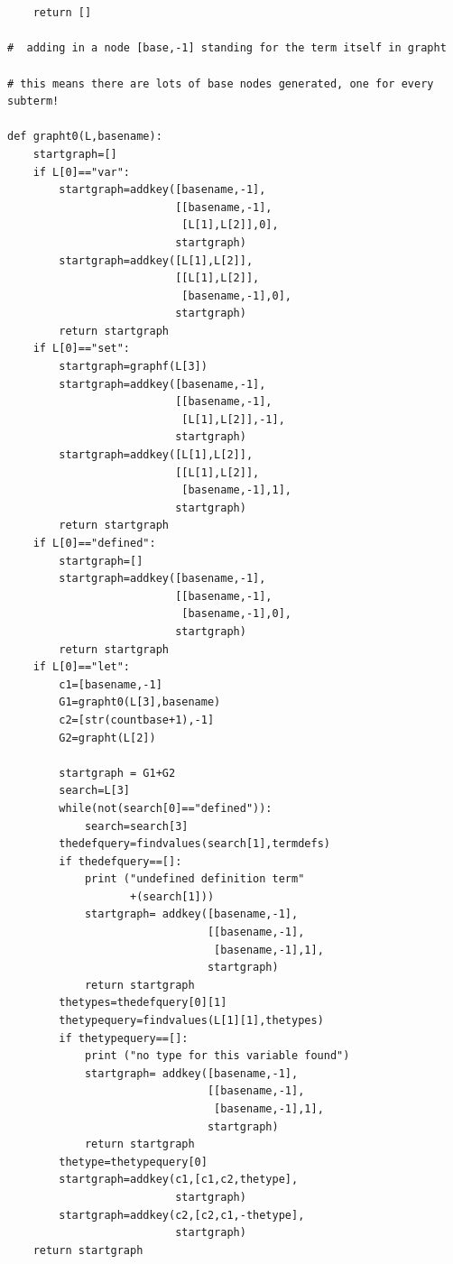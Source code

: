 \documentclass{article}
\begin{document}
\begin{verbatim}
        
        
    return []

#  adding in a node [base,-1] standing for the term itself in grapht

# this means there are lots of base nodes generated, one for every subterm!

def grapht0(L,basename):
    startgraph=[]
    if L[0]=="var":
        startgraph=addkey([basename,-1],
                          [[basename,-1],
                           [L[1],L[2]],0],
                          startgraph)
        startgraph=addkey([L[1],L[2]],
                          [[L[1],L[2]],
                           [basename,-1],0],
                          startgraph)
        return startgraph
    if L[0]=="set":
        startgraph=graphf(L[3])
        startgraph=addkey([basename,-1],
                          [[basename,-1],
                           [L[1],L[2]],-1],
                          startgraph)
        startgraph=addkey([L[1],L[2]],
                          [[L[1],L[2]],
                           [basename,-1],1],
                          startgraph)
        return startgraph
    if L[0]=="defined":
        startgraph=[]
        startgraph=addkey([basename,-1],
                          [[basename,-1],
                           [basename,-1],0],
                          startgraph)
        return startgraph
    if L[0]=="let":
        c1=[basename,-1]
        G1=grapht0(L[3],basename)
        c2=[str(countbase+1),-1]
        G2=grapht(L[2])
        
        startgraph = G1+G2
        search=L[3]
        while(not(search[0]=="defined")):
            search=search[3]
        thedefquery=findvalues(search[1],termdefs)
        if thedefquery==[]:
            print ("undefined definition term"
                   +(search[1]))
            startgraph= addkey([basename,-1],
                               [[basename,-1],
                                [basename,-1],1],
                               startgraph)
            return startgraph
        thetypes=thedefquery[0][1]
        thetypequery=findvalues(L[1][1],thetypes)
        if thetypequery==[]:
            print ("no type for this variable found")
            startgraph= addkey([basename,-1],
                               [[basename,-1],
                                [basename,-1],1],
                               startgraph)
            return startgraph
        thetype=thetypequery[0]
        startgraph=addkey(c1,[c1,c2,thetype],
                          startgraph)
        startgraph=addkey(c2,[c2,c1,-thetype],
                          startgraph)
    return startgraph


\end{verbatim}
\end{document}
